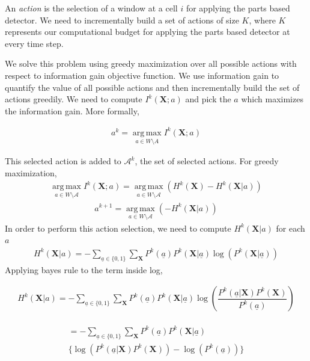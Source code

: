 \documentclass[10pt,twocolumn,letterpaper]{article}
\begin{document}
An \textit{action} is the selection of a window at a cell $i$ for applying the parts based detector. We need to incrementally build a set of actions of size $ K $, where $ K $ represents our computational budget for applying the parts based detector at every time step. 

We solve this problem using greedy maximization over all possible actions with respect to information gain objective function. We use information gain to quantify the value of all possible actions and then incrementally build the set of actions greedily.
We need to compute $I^{k}(\textbf{X};a)$ and pick the $a$ which maximizes the information gain. More formally,

\begin{align}
a^{k} = \operatorname*{arg\,max}_{a\in W \setminus A} I^{k}(\textbf{X};a)
\end{align}

This selected action is added to $\mathcal{A}^{k}$, the set of selected actions.
For greedy maximization,
\begin{align}
\operatorname*{arg\,max}_{a\in W \setminus{\mathcal{A}}}I^{k}(\textbf{X}; a) =\operatorname*{arg\,max}_{a\in W \setminus{\mathcal{A}}} (H^{k}(\textbf{X}) - H^{k}(\textbf{X}|a))
\end{align}
\begin{align}
a^{k+1} =\operatorname*{arg\,max}_{a\in W \setminus{\mathcal{A}}} (- H^{k}(\textbf{X}|a))
\end{align}
In order to perform this action selection, we need to compute $H^{k}(\textbf{X}|a)$ for each $a$
\begin{align}
H^{k}(\textbf{X}| a) = -\sum_{\underline{a}\in\lbrace 0 ,1 \rbrace} \sum_{\textbf{X}} P^{k}(\underline{a})P^{k}(\textbf{X}| \underline{a}) \log(P^{k}(\textbf{X}| \underline{a}))
\end{align}
Applying bayes rule to the term inside log,

\begin{align}
H^{k}(\textbf{X}| a)= -\sum_{\underline{a}\in\lbrace 0 ,1 \rbrace} \sum_{\textbf{X}} P^{k}( \underline{a})P^{k}(\textbf{X}| \underline{a}) \log(\dfrac{P^{k}( \underline{a}|\textbf{X})P^{k}(\textbf{X})}{P^{k}( \underline{a})})
\end{align}

\begin{align}
\label{Eq:infogain}
\begin{split}
 = -\sum_{\underline{a}\in\lbrace 0 ,1 \rbrace} \sum_{\textbf{X}} P^{k}( \underline{a})  P^{k}(\textbf{X}| \underline{a}) \\ \Big\lbrace\log(P^{k}( \underline{a}|\textbf{X})P^{k}(\textbf{X})) - \log(P^{k}( \underline{a}))\Big\rbrace
\end{split}
\end{align}
\end{document}
